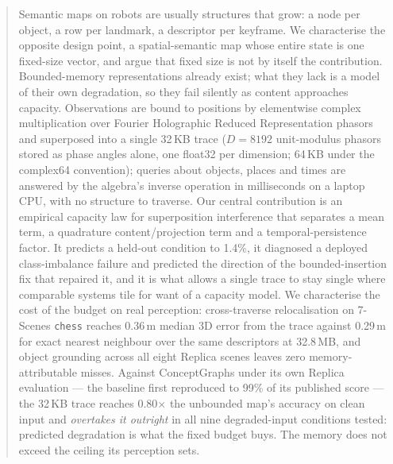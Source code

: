 \documentclass[conference]{IEEEtran}
\begin{document}
\begin{abstract}
Semantic maps on robots are usually structures that grow: a node per
object, a row per landmark, a descriptor per keyframe. We characterise
the opposite design point, a spatial-semantic map whose entire state is
one fixed-size vector, and argue that fixed size is not by itself the
contribution. Bounded-memory representations already exist; what they
lack is a model of their own degradation, so they fail silently as
content approaches capacity. Observations are bound to positions by
elementwise complex multiplication over Fourier Holographic Reduced
Representation phasors and superposed into a single 32\,KB trace
($D=8192$ unit-modulus phasors stored as phase angles alone, one float32
per dimension; 64\,KB under the complex64 convention); queries about
objects, places and times are answered by the algebra's inverse
operation in milliseconds on a laptop CPU, with no structure to
traverse. Our central contribution is an empirical capacity law for
superposition interference that separates a mean term, a quadrature
content/projection term and a temporal-persistence factor. It predicts a
held-out condition to 1.4\%, it diagnosed a deployed class-imbalance
failure and predicted the direction of the bounded-insertion fix that
repaired it, and it is what allows a single trace to stay single where
comparable systems tile for want of a capacity model. We characterise
the cost of the budget on real perception: cross-traverse relocalisation
on 7-Scenes \texttt{chess} reaches 0.36\,m median 3D error from the
trace against 0.29\,m for exact nearest neighbour over the same
descriptors at 32.8\,MB, and object grounding across all eight Replica
scenes leaves zero memory-attributable misses. Against ConceptGraphs
under its own Replica evaluation --- the baseline first reproduced to
99\% of its published score --- the 32\,KB trace reaches 0.80$\times$
the unbounded map's accuracy on clean input and \emph{overtakes it
outright} in all nine degraded-input conditions tested: predicted
degradation is what the fixed budget buys. The memory does not exceed
the ceiling its perception sets.
\end{abstract}
\end{document}
